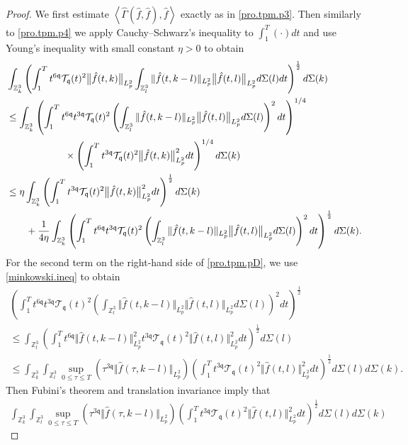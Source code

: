 \documentclass[reqno]{amsart}
\newcommand{\pv}{p}
\def\norm#1{\big\Vert#1\big\Vert}
\newcommand{\irnp}[2]{\left\langle {#1},{#2} \right\rangle}
\newcommand{\qq}{\mathfrak{q}}
\newcommand{\tTq}{t^{3\qq}}
\newcommand{\tQQq}{t^{6\qq}}
\newcommand{\Z}{\mathbb{Z}}
\newcommand{\tw}{\mathcal{T}_{\qq}}
\theoremstyle{definition}
\numberwithin{equation}{section}
\numberwithin{theorem}{section}
\begin{document}
\begin{proof}
We first estimate ${\irnp{\hat{\Gamma}(\hat{f},\hat{f})}{\hat{f}}}$ exactly as in \eqref{pro.tpm.p3}.  Then similarly to \eqref{pro.tpm.p4} we apply Cauchy--Schwarz's inequality to $\int_{1}^{T}(\cdot)dt$ and use Young's inequality with  small constant $\eta>0$ to obtain
\begin{align}
&\int_{\Z^3_k}\left(\int^{T}_{1} \tQQq \tw(t)^2\norm{\hat{f}(t,k)}_{L^2_{\pv}}\int_{\Z^3_l}\Vert \hat{f}(t,k-l)\Vert_{L^2_{\pv}} \norm{\hat{f}(t,l)}_{L^2_{\pv}}  d\Sigma(l)dt\right)^{\frac12}d\Sigma(k)
\notag
\\
&\leq \int_{\Z^3_k} \left(\int^{T}_{1} \tQQq \tTq \tw(t)^2\left(\int_{\Z^3_l} \Vert \hat{f}(t,k-l)\Vert_{L^2_{\pv}} \norm{\hat{f}(t,l)}_{L^2_{\pv}}d\Sigma(l)\right)^2dt\right)^{1/4}
\notag
\\
&\qquad\qquad\qquad\times \left(\int^{T}_{1} \tTq \tw(t)^2\norm{\hat{f}(t,k)}_{L^2_{\pv}}^2 dt\right)^{1/4} d\Sigma(k)
\notag
\\
&\leq \eta\int_{\Z^3_k}\left(\int^{T}_{1} \tTq \tw(t)^2\norm{\hat{f}(t,k)}_{L^2_{\pv}}^2 dt\right)^{\frac12}d\Sigma(k)
\label{pro.tpm.pD}
\\ \notag
&\qquad+\frac{1}{4\eta} \int_{\Z^3_k}\left(\int^{T}_{1} \tQQq \tTq \tw(t)^2\left(\int_{\Z^3_l} \Vert \hat{f}(t,k-l)\Vert_{L^2_{\pv}} \norm{\hat{f}(t,l)}_{L^2_{\pv}}d\Sigma(l)\right)^2dt\right)^{\frac12} d\Sigma(k).
\end{align}
For the second term on the right-hand side of \eqref{pro.tpm.pD},
we use \eqref{minkowski.ineq} to obtain
\begin{multline*}
\left(\int^{T}_{1} \tQQq \tTq \tw(t)^2\left(\int_{\Z^3_l} \Vert \hat{f}(t,k-l)\Vert_{L^2_{\pv}} \norm{\hat{f}(t,l)}_{L^2_{\pv}}d\Sigma(l)\right)^2dt\right)^{\frac12}
\\
\leq
\int_{\Z^3_l} \left(\int^{T}_{1} \tQQq \Vert \hat{f}(t,k-l)\Vert_{L^2_{\pv}}^2 \tTq \tw(t)^2\norm{\hat{f}(t,l)}_{L^2_{\pv}}^2 dt\right)^{\frac12}d\Sigma(l)
\\
\leq 
\int_{\Z^3_k} \int_{\Z^3_l} \sup_{0\le \tau\le T} \left( \tau^{3\qq}\Vert \hat{f}(\tau,k-l) \Vert_{L^2_{\pv}}\right) \left(\int^{T}_{1} \tTq\tw(t)^2\norm{\hat{f}(t,l)}_{L^2_{\pv}}^2 dt\right)^{\frac12}d\Sigma(l) d\Sigma(k).
\end{multline*}
Then Fubini's theorem and translation invariance imply that
\begin{multline*}
    \int_{\Z^3_k} \int_{\Z^3_l} \sup_{0\le \tau\le T} \left( \tau^{3\qq}\Vert \hat{f}(\tau,k-l) \Vert_{L^2_{\pv}}\right) \left(\int^{T}_{1} \tTq \tw(t)^2\norm{\hat{f}(t,l)}_{L^2_{\pv}}^2 dt\right)^{\frac12}d\Sigma(l) d\Sigma(k)

\end{multline*}
\end{proof}
\end{document}

